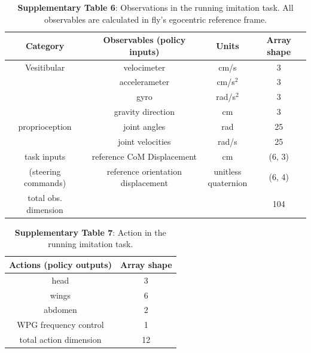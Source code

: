 \documentclass[sn-mathphys-num]{sn-jnl}%
\theoremstyle{thmstyleone}	%
\theoremstyle{thmstyletwo}	%
\theoremstyle{thmstylethree}	%
\begin{document}
\begin{appendices}
\begin{table}[htbp]
	\centering
	\small
	\caption{\textbf{Supplementary Table 6}: 
		Observations in the running imitation task. 
		All observables are calculated in fly’s egocentric reference frame.}
	\begin{tabular}{cccc}
		\toprule
		Category         &        Observables (policy inputs)  & Units  & Array shape  \\
		\midrule
		Vesitibular     &  velocimeter      &   cm/s & 3  \\
		     &  accelerameter      &   cm/s$ ^2 $ & 3  \\
		     &  gyro      &   rad/s$ ^2 $ & 3  \\
		     &  gravity direction      &   cm & 3  \\
		\midrule
		proprioception     &  joint angles      &   rad & 25  \\
		     &  joint velocities      &   rad/s & 25  \\
		\midrule
		task inputs     &  reference CoM Displacement      &   cm & (6, 3)  \\
		(steering commands)     &  reference orientation displacement      &   \makecell{unitless \\quaternion} & (6, 4)  \\
		\midrule
		total obs. dimension     &        &    & 104  \\
		\bottomrule
	\end{tabular}%
	\label{tab:s_6}%
\end{table}%



\begin{table}[htbp]
	\centering
	\caption{\textbf{Supplementary Table 7}: Action in the running imitation task.}
	\small
	\begin{tabular}{cc}
		\toprule
		Actions (policy outputs)         &        Array shape     \\
		\midrule
		head      &   3      \\
		wings      &   6      \\
		abdomen      &   2      \\
		WPG frequency control      &   1      \\
		\midrule
		total action dimension      &   12      \\
		\bottomrule
	\end{tabular}%
	\label{tab:s_7}%
\end{table}%



\end{appendices}
\end{document}
